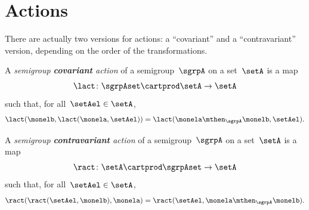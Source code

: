 

%



\section{Actions}
\label{sec:actions}

There are actually two versions for actions: a ``covariant'' and a ``contravariant'' version, depending on the order of the transformations.

\begin{ctdefinition}
    \label{def:semigroup-cov-action-prelim}
    A \emph{semigroup \textbf{covariant} action} of a semigroup~$\sgrpA$ on a set~$\setA$ is a map
    \begin{equation}
        \label{eq:lact}
        \lact \colon \sgrpAset \cartprod \setA \to \setA
    \end{equation}
    such that, for all~$\setAel \in \setA$,
    \begin{equation}
        \label{eq:lact1cond}
        \lact(\monelb, \lact(\monela, \setAel)) = \lact(\monela \mthen_\sgrpA \monelb, \setAel).
    \end{equation}
\end{ctdefinition}


\begin{ctdefinition}
    \label{def:semigroup-contra-action-prelim}
    A \emph{semigroup \textbf{contravariant} action} of a semigroup~$\sgrpA$ on a set~$\setA$ is a map
    \begin{equation}
        \label{eq:ract}
        \ract \colon \setA \cartprod \sgrpAset \to \setA
    \end{equation}
    such that, for all~$\setAel \in \setA$,
    \begin{equation}
        \label{eq:ract1cond}
        \ract(\ract(\setAel, \monelb), \monela) = \ract(\setAel, \monela \mthen_\sgrpA \monelb).
    \end{equation}
\end{ctdefinition}

